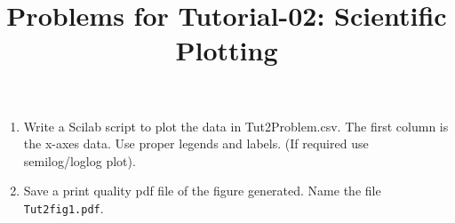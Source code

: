 \documentclass[10pt,a4paper]{article}
\begin{document}
\title{Problems for Tutorial-02: Scientific Plotting}
\date{}
\maketitle
\begin{enumerate}
\item Write a Scilab script to plot the data in Tut2Problem.csv. 
The first column is the x-axes data. Use proper legends and labels.
(If required use semilog/loglog plot).
\item Save a print quality pdf file of the figure generated. Name the 
file \verb'Tut2fig1.pdf'.
\end{enumerate}
\end{document}
